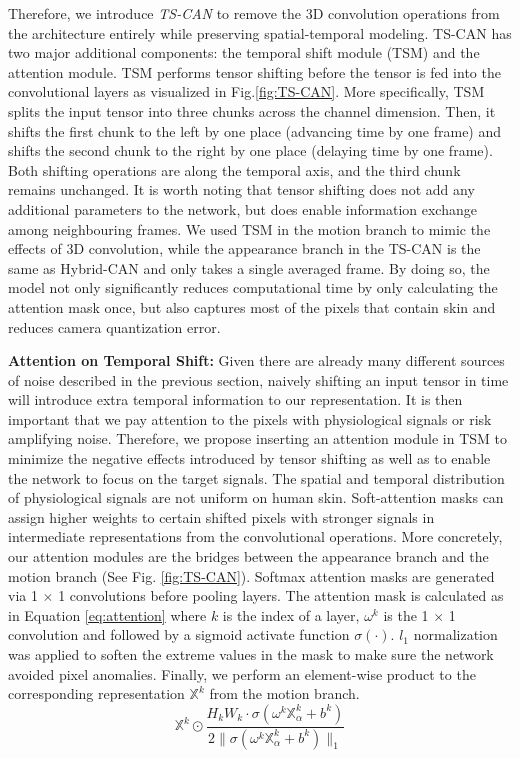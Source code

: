 \documentclass{article}
\begin{document}
Therefore, we introduce \textit{TS-CAN} to remove the 3D convolution operations from the architecture entirely while preserving spatial-temporal modeling. TS-CAN has two major additional components: the temporal shift module (TSM) \citep{lin2019tsm} and the attention module. TSM performs tensor shifting before the tensor is fed into the convolutional layers as visualized in Fig.\ref{fig:TS-CAN}. More specifically, TSM splits the input tensor into three chunks across the channel dimension. Then, it shifts the first chunk to the left by one place (advancing time by one frame) and shifts the second chunk to the right by one place (delaying time by one frame). Both shifting operations are along the temporal axis, and the third chunk remains unchanged. It is worth noting that tensor shifting does not add any additional parameters to the network, but does enable information exchange among neighbouring frames. We used TSM in the motion branch to mimic the effects of 3D convolution, while the appearance branch in the TS-CAN is the same as Hybrid-CAN and only takes a single averaged frame. By doing so, the model not only significantly reduces computational time by only calculating the attention mask once, but also captures most of the pixels that contain skin and reduces camera quantization error. 

\textbf{Attention on Temporal Shift:} 
Given there are already many different sources of noise described in the previous section, naively shifting an input tensor in time will introduce extra temporal information to our representation. It is then important that we pay attention to the pixels with physiological signals or risk amplifying noise. Therefore, we propose inserting an attention module in TSM to minimize the negative effects introduced by tensor shifting as well as to enable the network to focus on the target signals.
The spatial and temporal distribution of physiological signals are not uniform on human skin. Soft-attention masks can assign higher weights to certain shifted pixels with stronger signals in intermediate representations from the convolutional operations. More concretely, our attention modules are the bridges between the appearance branch and the motion branch (See Fig. \ref{fig:TS-CAN}). Softmax attention masks are generated via 1 $\times$ 1 convolutions before pooling layers. The attention mask is calculated as in Equation \ref{eq:attention} where $k$ is the index of a layer,  $\omega^k$  is the  1 $\times$ 1 convolution and followed by a sigmoid activate function $\sigma(\cdot)$. $l_1$ normalization was applied to soften the extreme values in the mask to make sure the network avoided pixel anomalies. Finally, we perform an element-wise product to the corresponding representation $\mathbb{X}^k$ from the motion branch. 
\begin{equation} \label{eq:attention}
    \mathbb{X}^k \odot \frac{H_k W_k \cdot \sigma(\omega^k\mathbb{X}_{\alpha}^k + b^k)}
    {2\parallel\sigma(\omega^k\mathbb{X}_{\alpha}^k + b^k)\parallel_1}
\end{equation}
\end{document}
